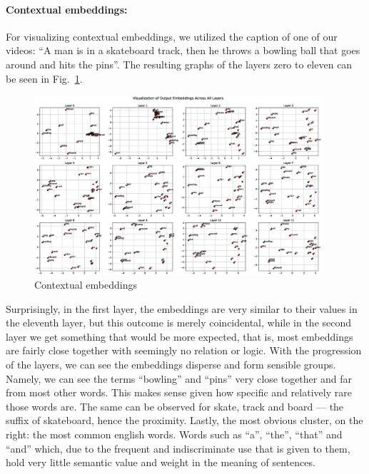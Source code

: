\documentclass[runningheads]{llncs}
\begin{document}
\paragraph{Contextual embeddings:}For visualizing contextual embeddings, we utilized the caption of one of our videos: 
``A man is in a skateboard track, then he throws a bowling ball that goes around and hits the pins''. 
The resulting graphs of the layers zero to eleven can be seen in Fig.~\ref{hidden_layers}.

\vspace{2\baselineskip plus 0.5\baselineskip minus 0.5\baselineskip} 


\begin{figure}[H]
\includegraphics[width=0.95\textwidth]{../figures/hidden_layers.eps}
\caption{Contextual embeddings}\label{hidden_layers}
\end{figure}

\vspace{2\baselineskip plus 0.5\baselineskip minus 0.5\baselineskip} 

Surprisingly, in the first layer, the embeddings are very similar to their values in the eleventh layer, but this outcome is merely coincidental, while in the second layer we get something that would be more expected, that is, most embeddings are fairly close together with seemingly no relation or logic. With the progression of the layers, we can see the embeddings disperse and form sensible groups. Namely, we can see the terms ``bowling'' and ``pins'' very close together and far from most other words. This makes sense given how specific and relatively rare those words are. The same can be observed for skate, track and board --- the suffix of skateboard, hence the proximity. Lastly, the most obvious cluster, on the right: the most common english words. Words such as ``a'', ``the'', ``that'' and ``and'' which, due to the frequent and indiscriminate use that is given to them, hold very little semantic value and weight in the meaning of sentences.
\end{document}
